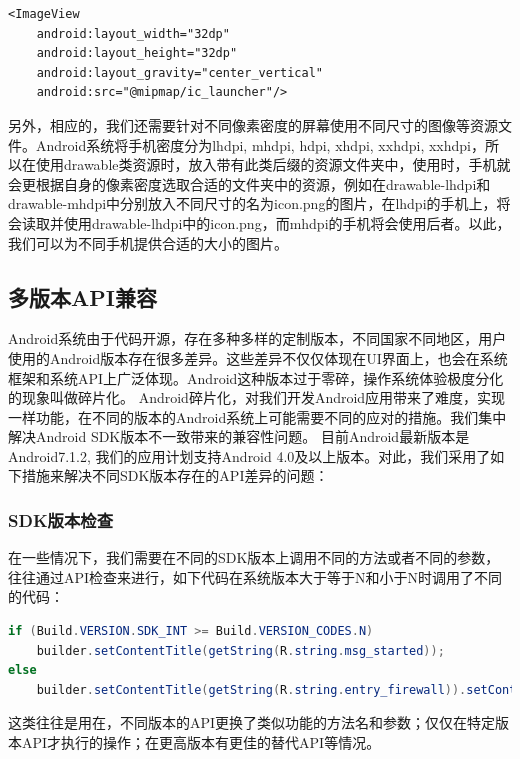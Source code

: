 \documentclass[format=final, language=chinese, degree=fyp]{hustthesis}
\begin{document}
\begin{lstlisting}
<ImageView
	android:layout_width="32dp"
	android:layout_height="32dp"
	android:layout_gravity="center_vertical"
	android:src="@mipmap/ic_launcher"/>
\end{lstlisting}

另外，相应的，我们还需要针对不同像素密度的屏幕使用不同尺寸的图像等资源文件。Android系统将手机密度分为lhdpi, mhdpi, hdpi, xhdpi, xxhdpi, xxhdpi，所以在使用drawable类资源时，放入带有此类后缀的资源文件夹中，使用时，手机就会更根据自身的像素密度选取合适的文件夹中的资源，例如在drawable-lhdpi和drawable-mhdpi中分别放入不同尺寸的名为icon.png的图片，在lhdpi的手机上，将会读取并使用drawable-lhdpi中的icon.png，而mhdpi的手机将会使用后者。以此，我们可以为不同手机提供合适的大小的图片。




\subsection{多版本API兼容}

Android系统由于代码开源，存在多种多样的定制版本，不同国家不同地区，用户使用的Android版本存在很多差异。这些差异不仅仅体现在UI界面上，也会在系统框架和系统API上广泛体现。Android这种版本过于零碎，操作系统体验极度分化的现象叫做碎片化。
Android碎片化，对我们开发Android应用带来了难度，实现一样功能，在不同的版本的Android系统上可能需要不同的应对的措施。我们集中解决Android SDK版本不一致带来的兼容性问题。
目前Android最新版本是Android7.1.2, 我们的应用计划支持Android 4.0及以上版本。对此，我们采用了如下措施来解决不同SDK版本存在的API差异的问题：

\subsubsection{SDK版本检查}
在一些情况下，我们需要在不同的SDK版本上调用不同的方法或者不同的参数，往往通过API检查来进行，如下代码在系统版本大于等于N和小于N时调用了不同的代码：
 
\begin{lstlisting}[language=java]
if (Build.VERSION.SDK_INT >= Build.VERSION_CODES.N)
  	builder.setContentTitle(getString(R.string.msg_started));
else
    builder.setContentTitle(getString(R.string.entry_firewall)).setContentText(getString(R.string.msg_started));
\end{lstlisting}


这类往往是用在，不同版本的API更换了类似功能的方法名和参数；仅仅在特定版本API才执行的操作；在更高版本有更佳的替代API等情况。
\end{document}
